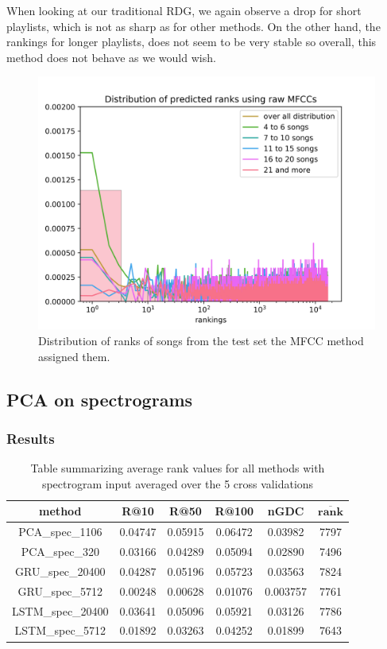  When looking at our traditional RDG, we again observe a drop for short playlists, which is not as sharp as for other methods. On the other hand, the rankings for longer playlists, does not seem to be very stable so overall, this method does not behave as we would wish.
 
\begin{figure}[h]
    \centering
	\includegraphics[width=120mm]{./img/mfcc_graph.png}
	\caption{Distribution of ranks of songs from the test set the MFCC method assigned them.}
	\label{fig:mfcc_graph}
\end{figure}


\subsection{PCA on spectrograms}

\subsubsection{Results}

\begin{table}[h]
\centering
\renewcommand{\arraystretch}{1.5}
\begin{tabu} to 1\textwidth { | c || c | c | c | c | c |}
 \hline
 \textbf{method} & \textbf{R@10} & \textbf{R@50} & \textbf{R@100} & \textbf{nGDC} & $ \boldsymbol{\overline{rank}} $ \\
 \hline
 \hline
 PCA\_spec\_1106 & 0.04747 & 0.05915 &  0.06472 & 0.03982 & 7797 \\
 \hline
 PCA\_spec\_320 & 0.03166 & 0.04289 &  0.05094 & 0.02890 & 7496 \\
 \hline
 GRU\_spec\_20400 & 0.04287 & 0.05196 & 0.05723 & 0.03563 & 7824 \\
 \hline
 GRU\_spec\_5712 & 0.00248 & 0.00628 & 0.01076 & 0.003757 & 7761 \\
 \hline
 LSTM\_spec\_20400 & 0.03641 & 0.05096 & 0.05921 & 0.03126 & 7786 \\
 \hline
 LSTM\_spec\_5712 & 0.01892 & 0.03263 & 0.04252 &  0.01899 & 7643 \\
 \hline
\end{tabu} \\
\caption{Table summarizing average rank values for all methods with spectrogram input averaged over the 5 cross validations}
\label{table:spec_methods}
\end{table}
 

